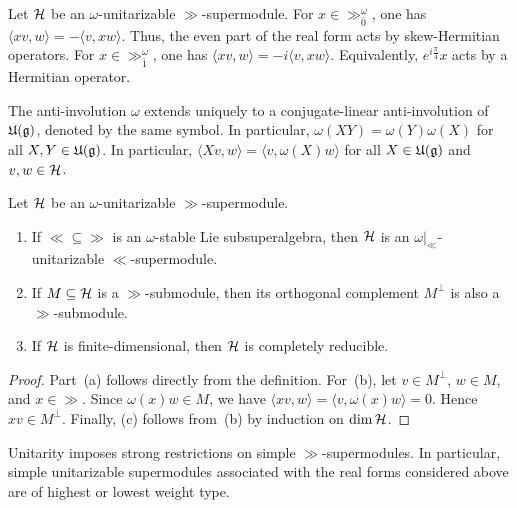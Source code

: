 \begin{remark}
Let ${\mathcal{H}}$ be an $\omega$-unitarizable $\gg$-supermodule. For $x\in\gg^\omega_{\bar0}$, one has
$
\langle xv,w\rangle=-\langle v,xw\rangle.
$
Thus, the even part of the real form acts by skew-Hermitian operators. For $x\in\gg^\omega_{\bar1}$, one has
$
\langle xv,w\rangle=-i\langle v,xw\rangle.
$
Equivalently, $e^{i\tfrac{\pi}{4}}x$ acts by a Hermitian operator.
\end{remark}

The anti-involution $\omega$ extends uniquely to a conjugate-linear anti-involution of ${\mathfrak U}({\mathfrak{g}})$, denoted by the same symbol. In particular,
$
\omega(XY)=\omega(Y)\omega(X)
$
for all $X,Y\in{\mathfrak U}({\mathfrak{g}})$. In particular,
$
\langle Xv,w\rangle=\langle v,\omega(X)w\rangle
$
for all $X\in{\mathfrak U}({\mathfrak{g}})$ and $v,w\in{\mathcal{H}}$.

\begin{lemma}\label{lemm::properties_unitarizable_supermodules}
Let ${\mathcal{H}}$ be an $\omega$-unitarizable $\gg$-supermodule.
\begin{enumerate}
    \item[(a)] If $\ll\subseteq\gg$ is an $\omega$-stable Lie subsuperalgebra, then ${\mathcal{H}}$ is an $\omega\vert_{\ll}$-unitarizable $\ll$-supermodule.

    \item[(b)] If $M\subseteq{\mathcal{H}}$ is a $\gg$-submodule, then its orthogonal complement $M^\perp$ is also a $\gg$-submodule.

    \item[(c)] If ${\mathcal{H}}$ is finite-dimensional, then ${\mathcal{H}}$ is completely reducible.
\end{enumerate}
\end{lemma}

\begin{proof}
Part~(a) follows directly from the definition. For~(b), let $v\in M^\perp$, $w\in M$, and $x\in\gg$. Since $\omega(x)w\in M$, we have
$
\langle xv,w\rangle=\langle v,\omega(x)w\rangle=0.
$
Hence $xv\in M^\perp$. Finally, (c) follows from~(b) by induction on $\dim{\mathcal{H}}$.
\end{proof}

Unitarity imposes strong restrictions on simple $\gg$-supermodules. In particular, simple unitarizable supermodules associated with the real forms considered above are of highest or lowest weight type.

